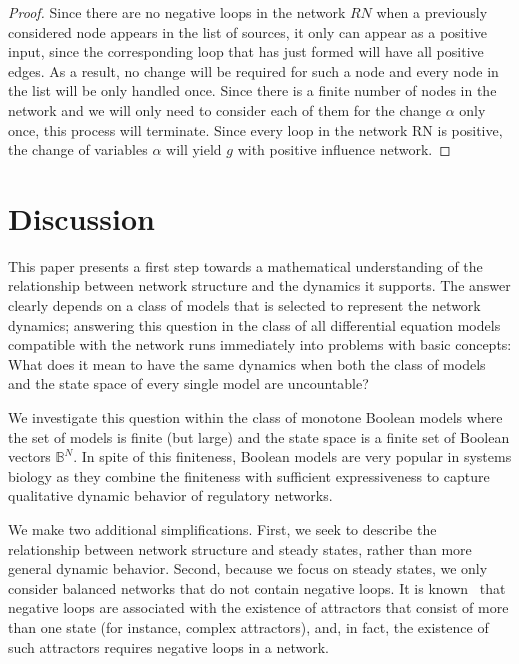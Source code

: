 \documentclass[10pt,letterpaper]{article}
\newcommand{\bbB}{\mathbb{B}}
\begin{document}
\begin{proof}
Since there are no negative loops in the network $RN$ when a previously considered node appears in the list of sources, it only can appear as a positive input, since the corresponding loop that has just formed will have all positive edges. As a result, no change will be required for such a node and every node in the list will be only handled once.
Since there is a finite number of nodes in the network and we will only need to consider each of them for the change $\alpha$ only once, this process will terminate.
Since every loop in the network RN is positive, the change of variables $\alpha$ will yield $g$ with positive influence network.

\end{proof}






\section{Discussion}
This paper presents a first step towards a mathematical understanding of the relationship between network structure and the dynamics it supports. The answer clearly depends on a class of models that is selected to represent the network dynamics; answering this question in the class of all differential equation models compatible with the network runs immediately into problems with basic concepts: What does it mean to have the same dynamics when both the class of models and the state space of every single model are uncountable?

We investigate this question within the class of monotone Boolean models where the set of models is finite (but large) and the state space is a finite set of Boolean vectors $\bbB^N$. In spite of this finiteness, Boolean models are very popular in systems biology as they combine the finiteness with sufficient expressiveness to capture qualitative dynamic behavior of regulatory networks.

We make two additional simplifications. First, we seek to describe the relationship between network structure and steady states, rather than more general dynamic behavior. Second, because we focus on steady states, we only consider balanced networks that do not contain negative loops. It is known~\cite{snoussi_necessary_1998} that negative loops are associated with the existence of attractors that consist of more than one state (for instance, complex attractors), and, in fact, the existence of such attractors requires negative loops in a network. 
\end{document}
